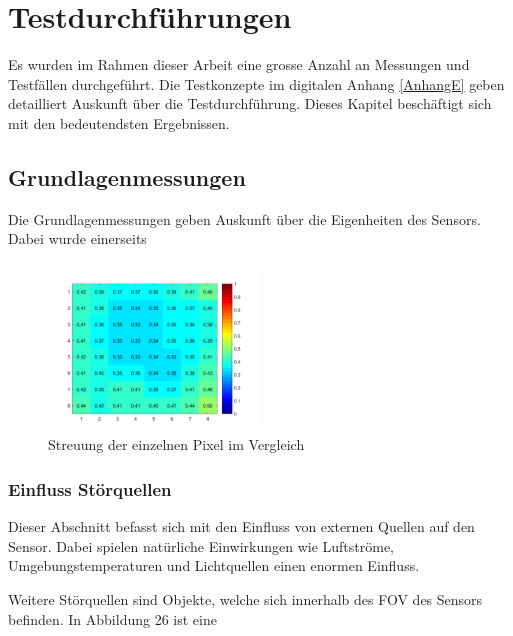 \chapter{Testdurchführungen}
\label{chap:Testphasen}

Es wurden im Rahmen dieser Arbeit eine grosse Anzahl an Messungen und Testfällen durchgeführt. Die Testkonzepte im digitalen Anhang \ref{AnhangE} geben detailliert Auskunft über die Testdurchführung. Dieses Kapitel beschäftigt sich mit den bedeutendsten Ergebnissen.

\section{Grundlagenmessungen}

Die Grundlagenmessungen geben Auskunft über die Eigenheiten des Sensors. Dabei wurde einerseits  



\subsection{}

\begin{figure}[H]
	\centering
	\includegraphics[width=0.5\textwidth]
	{fig/Distanz_140cm_std_.jpg}
	\caption[Streuung der einzelnen Pixel im Vergleich]{Streuung der einzelnen Pixel im Vergleich}
	\label{fig:Streuung}
\end{figure}


\subsection{Einfluss Störquellen}

Dieser Abschnitt befasst sich mit den Einfluss von externen Quellen auf den Sensor. Dabei spielen natürliche Einwirkungen wie Luftströme, Umgebungstemperaturen und Lichtquellen einen enormen Einfluss. 



Weitere Störquellen sind Objekte, welche sich innerhalb des \ac{FOV} des Sensors befinden. In Abbildung 26 ist eine



